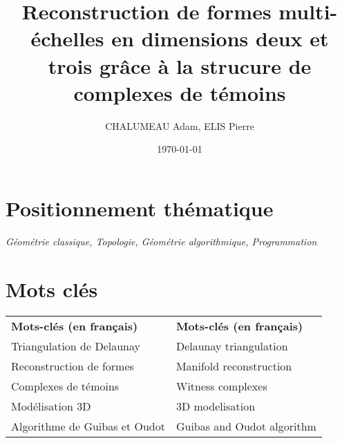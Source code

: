 \documentclass{article}
\title{\textbf{Reconstruction de formes multi-échelles en dimensions deux et trois grâce à la strucure de complexes de témoins}}
\author{CHALUMEAU Adam,	ELIS Pierre}
\date{\today}
\begin{document}
\maketitle

\section*{Positionnement thématique}
\textit{Géométrie classique, Topologie, Géométrie algorithmique, Programmation}

\section*{Mots clés}
\begin{tabular}{ll}
\textbf{Mots-clés (en français)} & \textbf{Mots-clés (en français)}\\
Triangulation de Delaunay        & Delaunay triangulation\\
Reconstruction de formes         & Manifold reconstruction\\
Complexes de témoins             & Witness complexes\\
Modélisation 3D                  & 3D modelisation\\
Algorithme de Guibas et Oudot    & Guibas and Oudot algorithm
\end{tabular}
\end{document}
